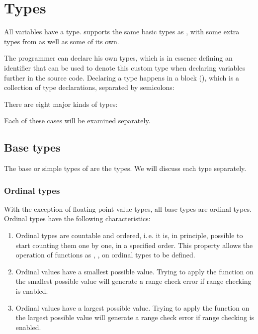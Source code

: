 \chapter{Types}
All variables have a type. \fpc supports the same basic types as \tp, with
some extra types from \delphi as well as some of its own.

The programmer can declare his own types, which is in essence defining an identifier
that can be used to denote this custom type when declaring variables further
in the source code. Declaring a type happens
in a  block (), which is a collection of type declarations, separated
by semicolons:

There are eight major kinds of types:

Each of these cases will be examined separately.

\section{Base types}
The base or simple types of \fpc are the \delphi types.
We will discuss each type separately.

\subsection{Ordinal types}
With the exception of floating point value types, all base types are ordinal
types. Ordinal types have the following characteristics:
\begin{enumerate}
\item Ordinal types are countable and ordered, i.\,e. it is, in principle,
possible to start counting them one by one, in a specified order.
This property allows the operation of functions as , ,
on ordinal types to be defined.
\item Ordinal values have a smallest possible value. Trying to apply the
 function on the smallest possible value will generate a range
check error if range checking is enabled.
\item Ordinal values have a largest possible value. Trying to apply the
 function on the largest possible value will generate a range
check error if range checking is enabled.
\end{enumerate}

